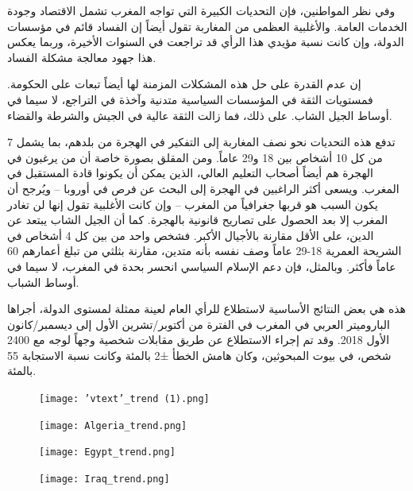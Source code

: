 \documentclass{article}
\begin{document}
وفي نظر المواطنين، فإن التحديات الكبيرة التي تواجه المغرب تشمل الاقتصاد وجودة الخدمات العامة. والأغلبية العظمى من المغاربة تقول أيضاً إن الفساد قائم في مؤسسات الدولة، وإن كانت نسبة مؤيدي هذا الرأي قد تراجعت في السنوات الأخيرة، وربما يعكس هذا جهود معالجة مشكلة الفساد. 

إن عدم القدرة على حل هذه المشكلات المزمنة لها أيضاً تبعات على الحكومة. فمستويات الثقة في المؤسسات السياسية متدنية وآخذة في التراجع، لا سيما في أوساط الجيل الشاب. على ذلك، فما زالت الثقة عالية في الجيش والشرطة والقضاء.

تدفع هذه التحديات نحو نصف المغاربة إلى التفكير في الهجرة من بلدهم، بما يشمل 7 من كل 10 أشخاص بين 18 و29 عاماً. ومن المقلق بصورة خاصة أن من يرغبون في الهجرة هم أيضاً أصحاب التعليم العالي، الذين يمكن أن يكونوا قادة المستقبل في المغرب. ويسعى أكثر الراغبين في الهجرة إلى البحث عن فرص في أوروبا – ويُرجح أن يكون السبب هو قربها جغرافياً من المغرب – وإن كانت الأغلبية تقول إنها لن تغادر المغرب إلا بعد الحصول على تصاريح قانونية بالهجرة. كما أن الجيل الشاب يبتعد عن الدين، على الأقل مقارنة بالأجيال الأكبر. فشخص واحد من بين كل 4 أشخاص في الشريحة العمرية 18-29 عاماً وصف نفسه بأنه متدين، مقارنة بثلثي من تبلغ أعمارهم 60 عاماً فأكثر. وبالمثل، فإن دعم الإسلام السياسي انحسر بحدة في المغرب، لا سيما في أوساط الشباب.

هذه هي بعض النتائج الأساسية لاستطلاع للرأي العام لعينة ممثلة لمستوى الدولة، أجراها الباروميتر العربي في المغرب في الفترة من أكتوبر/تشرين الأول إلى ديسمبر/كانون الأول 2018. وقد تم إجراء الاستطلاع عن طريق مقابلات شخصية وجهاً لوجه مع 2400 شخص، في بيوت المبحوثين، وكان هامش الخطأ ±2 بالمئة وكانت نسبة الاستجابة 55 بالمئة.

\newpage


\begin{figure}[H]
\centering
\caption{}
\texttt{[image: 'vtext'\_trend (1).png]}
\label{fig:my_label}
\end{figure}

\begin{figure}[H]
\centering
\caption{}
\texttt{[image: Algeria\_trend.png]}
\label{fig:my_label}
\end{figure}

\begin{figure}[H]
\centering
\caption{}
\texttt{[image: Egypt\_trend.png]}
\label{fig:my_label}
\end{figure}

\begin{figure}[H]
\centering
\caption{}
\texttt{[image: Iraq\_trend.png]}
\label{fig:my_label}
\end{figure}
\end{document}
